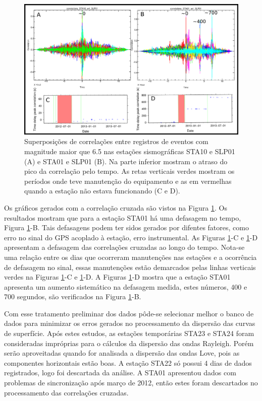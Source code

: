 \begin{figure}[!ht]
\centering
\includegraphics[scale=0.3]{Figs/correlacao_tempo_de_chegada_resultado.png}
\caption[Superposições de correlações entre registros de  eventos com magnitude maior que 6.5 nas estações sismográficas STA10 e SLP01 (A) e  STA01 e SLP01 (B)]{Superposições de correlações entre registros de  eventos com magnitude maior que 6.5 nas estações sismográficas STA10 e SLP01 (A) e  STA01 e SLP01 (B). Na parte inferior mostram o atraso do pico da correlação pelo tempo. As retas verticais verdes mostram os períodos onde teve manutenção do equipamento e as em vermelhas quando a estação não estava funcionando (C e D).}
\label{teste_tempo_results}
\end{figure}

Os gráficos gerados com a correlação cruzada são vistos na Figura \ref{teste_tempo_results}. Os resultados mostram que para a estação STA01 há uma defasagem no tempo, Figura \ref{teste_tempo_results}-B. Tais defasagens podem ter sidos gerados por difentes fatores, como erro no sinal do GPS acoplado à estação, erro instrumental. As Figuras \ref{teste_tempo_results}-C e \ref{teste_tempo_results}-D apresentam a defasagem das correlações cruzadas ao longo do tempo. Nota-se uma relação entre os  dias que ocorreram manutenções nas estações  e a ocorrência de defasagem no sinal, essas manutenções estão demarcados pelas linhas verticais verdes na Figuras \ref{teste_tempo_results}-C e \ref{teste_tempo_results}-D. A Figuras \ref{teste_tempo_results}-D mostra que a estação STA01 apresenta um aumento sistemático na defasagem medida, estes números, 400 e 700 segundos, são verificados na Figura \ref{teste_tempo_results}-B.

Com esse tratamento preliminar dos dados pôde-se selecionar melhor o banco de dados para minimizar os erros gerados no processamento da dispersão das curvas de superfície. Após estes estudos, as estações temporárias STA23 e STA24 foram consideradas impróprias para o cálculos da dispersão das ondas Rayleigh. Porém serão aproveitadas quando for analisada a dispersão das ondas Love, pois as componentes horizontais estão boas. A estação STA22 só possui 4 dias de dados registrados, logo foi descartada da análise. A STA01 apresentou dados com problemas de sincronização após março de 2012, então estes foram descartados no processamento das correlações cruzadas.

